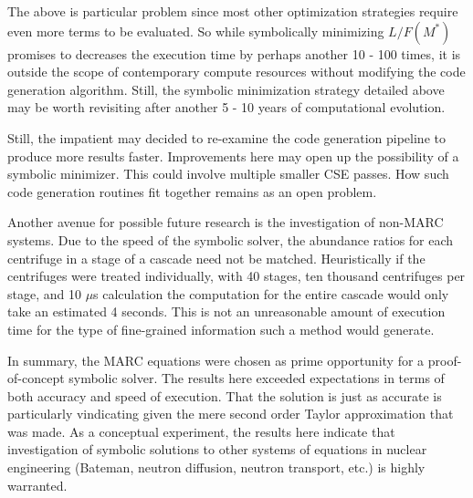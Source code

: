 \documentclass[preprint,12pt]{elsarticle}
\newcommand{\us}[0]{$\mu$s }
\begin{document}
The above is particular problem since most other optimization strategies require
even more terms to be evaluated.  So while symbolically minimizing $L/F(M^*)$ promises
to decreases the execution time by perhaps another 10 - 100 times, it is 
outside the scope of contemporary compute resources without modifying the 
code generation algorithm.  Still, the symbolic minimization strategy detailed above
may be worth revisiting after another 5 - 10 years of computational evolution.

Still, the impatient may decided to re-examine the code generation pipeline to 
produce more results faster.  Improvements here may open up the possibility of
a symbolic minimizer.  This could involve multiple smaller CSE passes.  How 
such code generation routines fit together remains as an open problem.

Another avenue for possible future research is the investigation of non-MARC 
systems.  Due to the speed of the symbolic solver, the abundance ratios for 
each centrifuge in a stage of a cascade need not be matched.  Heuristically
if the centrifuges were treated individually, with 40 stages, ten thousand 
centrifuges per stage, and 10 \us calculation the computation for the entire
cascade would only take an estimated 4 seconds.  This is not an unreasonable 
amount of execution time for the type of fine-grained information such a 
method would generate.  

In summary, the MARC equations were chosen as prime opportunity for a 
proof-of-concept symbolic solver.  The results here exceeded expectations in terms
of both accuracy and speed of execution.  That the solution is just as accurate 
is particularly vindicating given the mere second order Taylor approximation that 
was made.  As a conceptual experiment, the results here indicate that
investigation of symbolic solutions to other systems of equations in 
nuclear engineering (Bateman, neutron diffusion, neutron transport, etc.) is
highly warranted.


\end{document}
